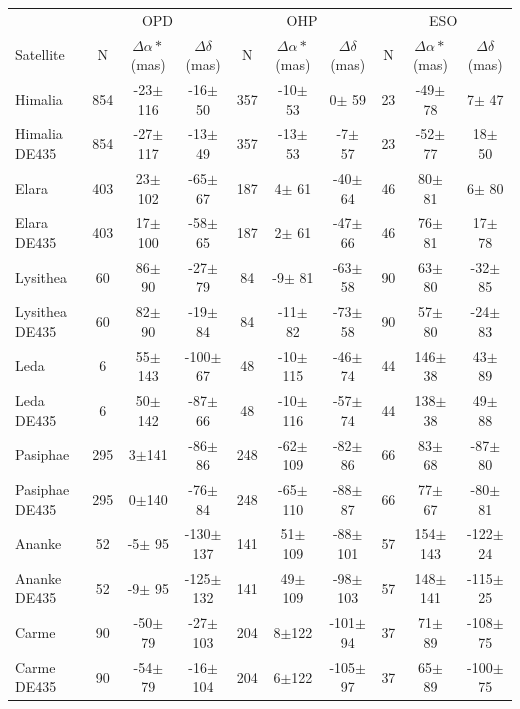 \documentclass[11pt,a4paper]{report}
\author{Altair Ramos}
\begin{document}
\begin{landscape}

\begin{table}
\begin{centering}
\begin{tabular}{l|ccc|ccc|ccc}
\hline  \hline
 & \multicolumn{3}{|c|}{OPD} & \multicolumn{3}{|c|}{OHP} & \multicolumn{3}{|c}{ESO}\tabularnewline
Satellite  & N & $\Delta\alpha*$ (mas) & $\Delta\delta$ (mas) & N & $\Delta\alpha*$ (mas) & $\Delta\delta$ (mas) & N & $\Delta\alpha*$ (mas) & $\Delta\delta$ (mas) \tabularnewline
\hline
Himalia  & 854 & -23$\pm$116 & -16$\pm$ 50 & 357 & -10$\pm$ 53 &  0$\pm$ 59 & 23 & -49$\pm$ 78 &   7$\pm$ 47 \tabularnewline
Himalia DE435 & 854 & -27$\pm$117 & -13$\pm$ 49 & 357 & -13$\pm$ 53 &  -7$\pm$ 57 & 23 & -52$\pm$ 77 &  18$\pm$ 50 \tabularnewline
\hdashline
Elara  & 403 &  23$\pm$102 & -65$\pm$ 67 & 187 &   4$\pm$ 61 & -40$\pm$ 64 & 46 &  80$\pm$ 81 &   6$\pm$ 80 \tabularnewline
Elara DE435 & 403 &  17$\pm$100 & -58$\pm$ 65 & 187 &   2$\pm$ 61 & -47$\pm$ 66 & 46 &  76$\pm$ 81 &  17$\pm$ 78 \tabularnewline
\hdashline
Lysithea & 60 &  86$\pm$ 90 & -27$\pm$ 79 & 84 &  -9$\pm$ 81 & -63$\pm$ 58 & 90 &  63$\pm$ 80 & -32$\pm$ 85 \tabularnewline
Lysithea DE435 & 60 &  82$\pm$ 90 & -19$\pm$ 84 & 84 & -11$\pm$ 82 & -73$\pm$ 58 & 90 &  57$\pm$ 80 & -24$\pm$ 83 \tabularnewline
\hdashline
Leda  & 6 &  55$\pm$143 & -100$\pm$ 67 & 48 & -10$\pm$115 & -46$\pm$ 74 & 44 & 146$\pm$ 38 &  43$\pm$ 89 \tabularnewline
Leda DE435 & 6 &  50$\pm$142 & -87$\pm$ 66 & 48 & -10$\pm$116 & -57$\pm$ 74 & 44 & 138$\pm$ 38 &  49$\pm$ 88 \tabularnewline
\hdashline
Pasiphae  & 295 &   3$\pm$141 & -86$\pm$ 86 & 248 & -62$\pm$109 & -82$\pm$ 86 & 66 &  83$\pm$ 68 & -87$\pm$ 80 \tabularnewline
Pasiphae DE435 & 295 &   0$\pm$140 & -76$\pm$ 84 & 248 & -65$\pm$110 & -88$\pm$ 87 & 66 &  77$\pm$ 67 & -80$\pm$ 81 \tabularnewline
\hdashline
Ananke  & 52 &  -5$\pm$ 95 & -130$\pm$137 & 141 &  51$\pm$109 & -88$\pm$101  & 57 & 154$\pm$143 & -122$\pm$ 24 \tabularnewline
Ananke DE435 & 52 &  -9$\pm$ 95 & -125$\pm$132 & 141 &  49$\pm$109 & -98$\pm$103 & 57 & 148$\pm$141 & -115$\pm$ 25 \tabularnewline
\hdashline
Carme  & 90 & -50$\pm$ 79 & -27$\pm$103 &  204 &   8$\pm$122 & -101$\pm$ 94 & 37 &  71$\pm$ 89 & -108$\pm$ 75 \tabularnewline
Carme DE435 & 90 & -54$\pm$ 79 & -16$\pm$104 & 204 &   6$\pm$122 & -105$\pm$ 97 & 37 &  65$\pm$ 89 & -100$\pm$ 75 \tabularnewline

\end{tabular}
\end{centering}
\end{table}
\end{landscape}
\end{document}
